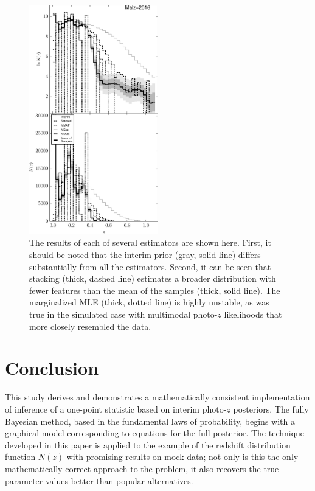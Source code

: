 \documentclass[preprint]{aastex}
\begin{document}
\begin{figure}
\includegraphics[width=0.5\textwidth]{figs/bias/comps.pdf}
\caption{The results of each of several estimators are shown here.  First, it 
should be noted that the interim prior (gray, solid line) differs substantially 
from all the estimators.  Second, it can be seen that stacking (thick, dashed 
line) estimates a broader distribution with fewer features than the mean of the 
samples (thick, solid line).  The marginalized MLE (thick, dotted line) is 
highly unstable, as was true in the simulated case with multimodal photo-$z$ 
likelihoods that more closely resembled the data.}
\label{fig:biascomp}
\end{figure}

\clearpage
\section{Conclusion}
\label{sec:con}

This study derives and demonstrates a mathematically consistent implementation 
of inference of a one-point statistic based on interim photo-$z$ posteriors.  
The fully Bayesian method, based in the fundamental laws of probability, begins 
with a graphical model corresponding to equations for the full posterior.  The 
technique developed in this paper is applied to the example of the redshift 
distribution function $N(z)$ with promising results on mock data; not only is 
this the only mathematically correct approach to the problem, it also recovers 
the true parameter values better than popular alternatives.  
\end{document}
